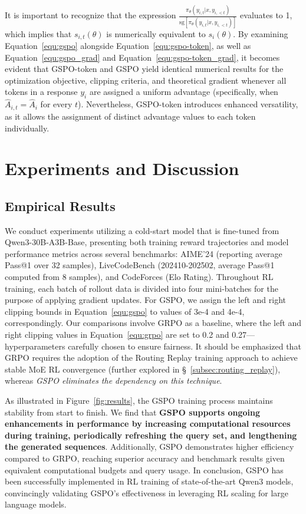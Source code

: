 It is important to recognize that the expression $\frac{ \pi_{\theta} (y_{i,t} | x, y_{i,<t}) }{ \mathrm{sg} \left[ \pi_{\theta} (y_{i,t} | x, y_{i,<t}) \right] }$ evaluates to 1, which implies that $s_{i,t}(\theta)$ is numerically equivalent to $s_{i}(\theta)$. By examining Equation~\eqref{equ:gspo} alongside Equation~\eqref{equ:gspo-token}, as well as Equation~\eqref{equ:gspo_grad} and Equation~\eqref{equ:gspo-token_grad}, it becomes evident that GSPO-token and GSPO yield identical numerical results for the optimization objective, clipping criteria, and theoretical gradient whenever all tokens in a response $y_i$ are assigned a uniform advantage (specifically, when $\widehat{A}_{i,t} = \widehat{A}_{i}$ for every $t$). Nevertheless, GSPO-token introduces enhanced versatility, as it allows the assignment of distinct advantage values to each token individually.

\section{Experiments and Discussion}

\subsection{Empirical Results}

We conduct experiments utilizing a cold-start model that is fine-tuned from Qwen3-30B-A3B-Base, presenting both training reward trajectories and model performance metrics across several benchmarks: AIME'24 (reporting average Pass@1 over 32 samples), LiveCodeBench (202410-202502, average Pass@1 computed from 8 samples), and CodeForces (Elo Rating). Throughout RL training, each batch of rollout data is divided into four mini-batches for the purpose of applying gradient updates. For GSPO, we assign the left and right clipping bounds in Equation~\eqref{equ:gspo} to values of 3e-4 and 4e-4, correspondingly. Our comparisons involve GRPO as a baseline, where the left and right clipping values in Equation~\eqref{equ:grpo} are set to 0.2 and 0.27—hyperparameters carefully chosen to ensure fairness. It should be emphasized that GRPO requires the adoption of the Routing Replay training approach to achieve stable MoE RL convergence (further explored in \S~\ref{subsec:routing_replay}), whereas \textit{GSPO eliminates the dependency on this technique}.

As illustrated in Figure~\ref{fig:results}, the GSPO training process maintains stability from start to finish. We find that \textbf{GSPO supports ongoing enhancements in performance by increasing computational resources during training, periodically refreshing the query set, and lengthening the generated sequences}. Additionally, GSPO demonstrates higher efficiency compared to GRPO, reaching superior accuracy and benchmark results given equivalent computational budgets and query usage. In conclusion, GSPO has been successfully implemented in RL training of state-of-the-art Qwen3 models, convincingly validating GSPO’s effectiveness in leveraging RL scaling for large language models.

